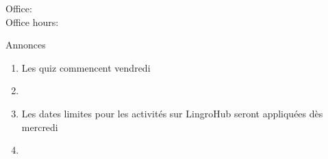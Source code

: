 \documentclass{beamer}
\subtitle[À la fac]{À la fac}
\begin{document}
  \begin{frame}
    \titlepage
    \tiny{Office: \\
          Office hours: }
  \end{frame}

  \begin{frame}{Annonces }
    \begin{enumerate}
      \item Les quiz commencent vendredi
      \item[] 
      \item Les dates limites pour les activités sur LingroHub seront appliquées dès mercredi
      \item[] 
    \end{enumerate}
  \end{frame}

\end{document}
